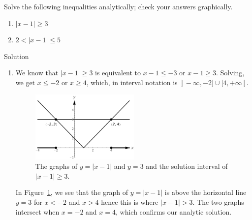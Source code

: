 \begin{example}

Solve the following inequalities analytically;  check your answers graphically.

\begin{enumerate}

\item  $|x-1| \geq 3$

\item  $2 < |x-1| \leq 5$


\end{enumerate}

Solution 


\begin{enumerate}
\item  We know that $|x-1|\geq3$ is equivalent to $x-1 \leq -3$ or $x-1 \geq 3$. Solving, we get $x \leq -2$ or $x \geq 4$, which, in interval notation is  $\left.\right]-\infty,-2] \cup [4,+\infty\left[\right.$.  

\begin{figure}[h!]
	\begin{center}
			\includegraphics[width=0.5\textwidth]{fig_functions_35}
	\caption{The graphs of $y = |x-1|$ and $y = 3$ and the solution interval of $|x-1| \geq 3$.}
	\label{fig_functions_35}
	\end{center}
\end{figure}

In Figure~\ref{fig_functions_35}, we see that the graph of $y=|x-1|$  is above the horizontal line $y=3$ for $x < -2$ and $x > 4$ hence this is where $|x-1| > 3$.  The two graphs intersect when $x=-2$ and $x=4$, which confirms our analytic solution.


\end{enumerate}
\end{example}

